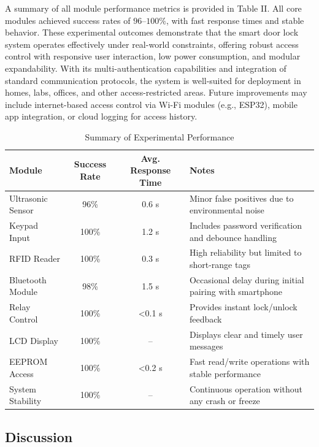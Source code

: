 \documentclass[conference, onecolumn]{IEEEtran}
\begin{document}
A summary of all module performance metrics is provided in Table II. All core modules achieved success rates of $96–100\%$, with fast response times and stable behavior. These experimental outcomes demonstrate that the smart door lock system operates effectively under real-world constraints, offering robust access control with responsive user interaction, low power consumption, and modular expandability. With its multi-authentication capabilities and integration of standard communication protocols, the system is well-suited for deployment in homes, labs, offices, and other access-restricted areas. Future improvements may include internet-based access control via Wi-Fi modules (e.g., ESP32), mobile app integration, or cloud logging for access history.

\renewcommand{\arraystretch}{1.3}  %

\begin{table}[H]
	\centering
	\caption{Summary of Experimental Performance}
	\begin{tabular}{|l|c|c|p{7cm}|}
		\hline
		\textbf{Module} & \textbf{Success Rate} & \textbf{Avg. Response Time} & \textbf{Notes} \\
		\hline
		Ultrasonic Sensor & 96\% & 0.6 s & Minor false positives due to environmental noise \\
		\hline
		Keypad Input & 100\% & 1.2 s & Includes password verification and debounce handling \\
		\hline
		RFID Reader & 100\% & 0.3 s & High reliability but limited to short-range tags \\
		\hline
		Bluetooth Module & 98\% & 1.5 s & Occasional delay during initial pairing with smartphone \\
		\hline
		Relay Control & 100\% & <0.1 s & Provides instant lock/unlock feedback \\
		\hline
		LCD Display & 100\% & -- & Displays clear and timely user messages \\
		\hline
		EEPROM Access & 100\% & <0.2 s & Fast read/write operations with stable performance \\
		\hline
		System Stability & 100\% & -- & Continuous operation without any crash or freeze \\
		\hline
	\end{tabular}
\end{table}

\subsection{Discussion}
\end{document}

